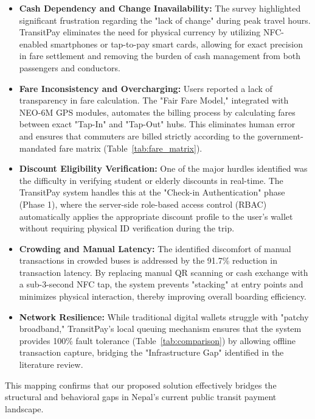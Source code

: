 \documentclass[sigconf, nonacm]{acmart}
\begin{document}
\begin{itemize}
    \item \textbf{Cash Dependency and Change Inavailability:} The survey highlighted significant frustration regarding the "lack of change" during peak travel hours. TransitPay eliminates the need for physical currency by utilizing NFC-enabled smartphones or tap-to-pay smart cards, allowing for exact precision in fare settlement and removing the burden of cash management from both passengers and conductors.
    
    \item \textbf{Fare Inconsistency and Overcharging:} Users reported a lack of transparency in fare calculation. The "Fair Fare Model," integrated with NEO-6M GPS modules, automates the billing process by calculating fares between exact "Tap-In" and "Tap-Out" hubs. This eliminates human error and ensures that commuters are billed strictly according to the government-mandated fare matrix (Table~\ref{tab:fare_matrix}).
    
    \item \textbf{Discount Eligibility Verification:} One of the major hurdles identified was the difficulty in verifying student or elderly discounts in real-time. The TransitPay system handles this at the "Check-in Authentication" phase (Phase 1), where the server-side role-based access control (RBAC) automatically applies the appropriate discount profile to the user's wallet without requiring physical ID verification during the trip.
    
    \item \textbf{Crowding and Manual Latency:} The identified discomfort of manual transactions in crowded buses is addressed by the 91.7\% reduction in transaction latency. By replacing manual QR scanning or cash exchange with a sub-3-second NFC tap, the system prevents "stacking" at entry points and minimizes physical interaction, thereby improving overall boarding efficiency.
    
    \item \textbf{Network Resilience:} While traditional digital wallets struggle with "patchy broadband," TransitPay's local queuing mechanism ensures that the system provides 100\% fault tolerance (Table~\ref{tab:comparison}) by allowing offline transaction capture, bridging the "Infrastructure Gap" identified in the literature review.
\end{itemize}

This mapping confirms that our proposed solution effectively bridges the structural and behavioral gaps in Nepal’s current public transit payment landscape.
\end{document}
